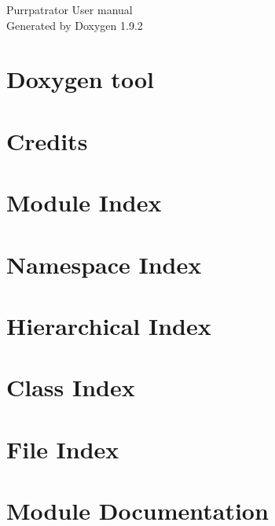 \documentclass[twoside]{book}
\newcommand{\+}{\discretionary{\mbox{\scriptsize$\hookleftarrow$}}{}{}}
\newcommand{\clearemptydoublepage}{%
    \newpage{\pagestyle{empty}\cleardoublepage}%
  }
\begin{document}
  \raggedbottom
  \begin{titlepage}
  \vspace*{7cm}
  \begin{center}%
  {\Large Purrpatrator User manual}\\
  \vspace*{1cm}
  {\large Generated by Doxygen 1.9.2}\\
  \end{center}
  \end{titlepage}
  \clearemptydoublepage
  \tableofcontents
  \clearemptydoublepage
\chapter{Doxygen tool}
\label{index}
\chapter{Credits}
\label{_credits}

\chapter{Module Index}

\chapter{Namespace Index}

\chapter{Hierarchical Index}

\chapter{Class Index}

\chapter{File Index}

\chapter{Module Documentation}



\end{document}
